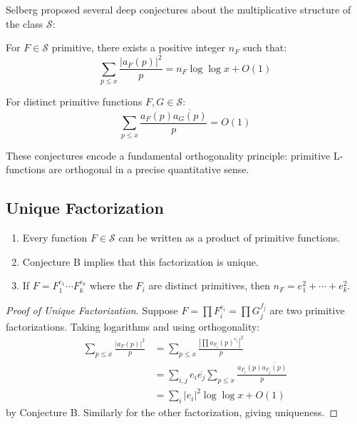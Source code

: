 Selberg proposed several deep conjectures about the multiplicative structure of the class $\mathcal{S}$:

\begin{conjecture}
For $F \in \mathcal{S}$ primitive, there exists a positive integer $n_F$ such that:
\begin{equation}
\sum_{p \leq x} \frac{|a_F(p)|^2}{p} = n_F \log \log x + O(1)
\end{equation}
\end{conjecture}

\begin{conjecture}
For distinct primitive functions $F, G \in \mathcal{S}$:
\begin{equation}
\sum_{p \leq x} \frac{a_F(p)\overline{a_G(p)}}{p} = O(1)
\end{equation}
\end{conjecture}

These conjectures encode a fundamental orthogonality principle: primitive L-functions are orthogonal in a precise quantitative sense.

\subsection{Unique Factorization}

\begin{theorem}
\begin{enumerate}
\item Every function $F \in \mathcal{S}$ can be written as a product of primitive functions.
\item Conjecture B implies that this factorization is unique.
\item If $F = F_1^{e_1} \cdots F_k^{e_k}$ where the $F_i$ are distinct primitives, then $n_F = e_1^2 + \cdots + e_k^2$.
\end{enumerate}
\end{theorem}

\begin{proof}[Proof of Unique Factorization]
Suppose $F = \prod F_i^{e_i} = \prod G_j^{f_j}$ are two primitive factorizations. Taking logarithms and using orthogonality:
\begin{align}
\sum_{p \leq x} \frac{|a_F(p)|^2}{p} &= \sum_{p \leq x} \frac{\left|\prod a_{F_i}(p)^{e_i}\right|^2}{p} \\
&= \sum_{i,j} e_i \overline{e_j} \sum_{p \leq x} \frac{a_{F_i}(p)\overline{a_{F_j}(p)}}{p} \\
&= \sum_i |e_i|^2 \log \log x + O(1)
\end{align}
by Conjecture B. Similarly for the other factorization, giving uniqueness.
\end{proof}

